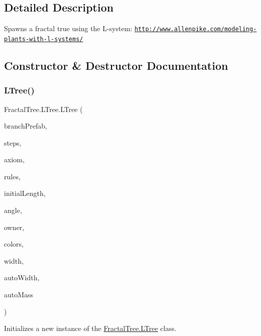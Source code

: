 \subsection{Detailed Description}
Spawns a fractal true using the L-\/system\+: \href{http://www.allenpike.com/modeling-plants-with-l-systems/}{\tt http\+://www.\+allenpike.\+com/modeling-\/plants-\/with-\/l-\/systems/} 



\subsection{Constructor \& Destructor Documentation}
\hypertarget{class_fractal_tree_1_1_l_tree_aa8fd4aff64da19419567e96b74d7c229}{}\label{class_fractal_tree_1_1_l_tree_aa8fd4aff64da19419567e96b74d7c229} 
\subsubsection{\texorpdfstring{L\+Tree()}{LTree()}}
{\footnotesize\ttfamily Fractal\+Tree.\+L\+Tree.\+L\+Tree (\begin{DoxyParamCaption}\item[{Game\+Object}]{branch\+Prefab,  }\item[{int}]{steps,  }\item[{string}]{axiom,  }\item[{\hyperlink{class_fractal_tree_1_1_l_rule}{L\+Rule} \mbox{[}$\,$\mbox{]}}]{rules,  }\item[{float}]{initial\+Length,  }\item[{float}]{angle,  }\item[{Transform}]{owner,  }\item[{Color \mbox{[}$\,$\mbox{]}}]{colors,  }\item[{float}]{width,  }\item[{bool}]{auto\+Width,  }\item[{bool}]{auto\+Mass }\end{DoxyParamCaption})}



Initializes a new instance of the \hyperlink{class_fractal_tree_1_1_l_tree}{Fractal\+Tree.\+L\+Tree} class. 


